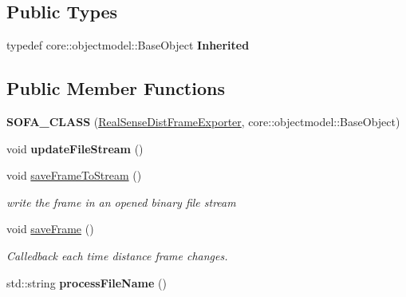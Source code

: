 \subsection*{Public Types}
\begin{DoxyCompactItemize}
\item 
\mbox{\label{classsofa_1_1rgbdtracking_1_1_real_sense_dist_frame_exporter_a3d5e841c18a10910a89dcaa8fafcaa53}} 
typedef core\+::objectmodel\+::\+Base\+Object {\bfseries Inherited}
\end{DoxyCompactItemize}
\subsection*{Public Member Functions}
\begin{DoxyCompactItemize}
\item 
\mbox{\label{classsofa_1_1rgbdtracking_1_1_real_sense_dist_frame_exporter_a4e09a848d4afe49248391a934c051eb5}} 
{\bfseries S\+O\+F\+A\+\_\+\+C\+L\+A\+SS} (\hyperlink{classsofa_1_1rgbdtracking_1_1_real_sense_dist_frame_exporter}{Real\+Sense\+Dist\+Frame\+Exporter}, core\+::objectmodel\+::\+Base\+Object)
\item 
\mbox{\label{classsofa_1_1rgbdtracking_1_1_real_sense_dist_frame_exporter_af0422eedd90f9e7b8c5b17c33994a39c}} 
void {\bfseries update\+File\+Stream} ()
\item 
\mbox{\label{classsofa_1_1rgbdtracking_1_1_real_sense_dist_frame_exporter_a97e36488ae57725cf05f28c1d70b18a3}} 
void \hyperlink{classsofa_1_1rgbdtracking_1_1_real_sense_dist_frame_exporter_a97e36488ae57725cf05f28c1d70b18a3}{save\+Frame\+To\+Stream} ()
\begin{DoxyCompactList}\small\item\em write the frame in an opened binary file stream \end{DoxyCompactList}\item 
\mbox{\label{classsofa_1_1rgbdtracking_1_1_real_sense_dist_frame_exporter_ab788c5084fff8f6e8ee0d7b000af871b}} 
void \hyperlink{classsofa_1_1rgbdtracking_1_1_real_sense_dist_frame_exporter_ab788c5084fff8f6e8ee0d7b000af871b}{save\+Frame} ()
\begin{DoxyCompactList}\small\item\em Calledback each time distance frame changes. \end{DoxyCompactList}\item 
\mbox{\label{classsofa_1_1rgbdtracking_1_1_real_sense_dist_frame_exporter_aa5ebbe273df7d13fe9a8f648aa624d1c}} 
std\+::string {\bfseries process\+File\+Name} ()
\end{DoxyCompactItemize}
